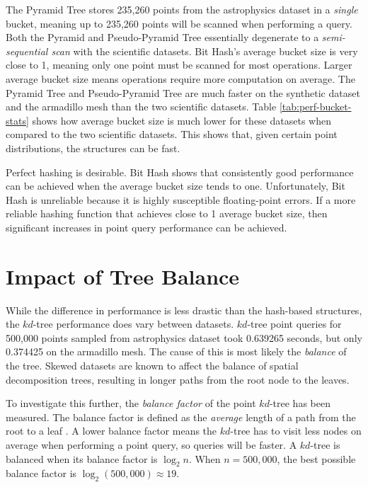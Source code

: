 The Pyramid Tree stores 235,260 points from the astrophysics dataset in a \textit{single} bucket, meaning up to 235,260 points will be scanned when performing a query. Both the Pyramid and Pseudo-Pyramid Tree essentially degenerate to a \textit{semi-sequential scan} with the scientific datasets. Bit Hash's average bucket size is very close to 1, meaning only one point must be scanned for most operations. Larger average bucket size means operations require more computation on average. The Pyramid Tree and Pseudo-Pyramid Tree are much faster on the synthetic dataset and the armadillo mesh than the two scientific datasets. Table \ref{tab:perf-bucket-stats} shows how average bucket size is much lower for these datasets when compared to the two scientific datasets. This shows that, given certain point distributions, the structures can be fast.

Perfect hashing is desirable. Bit Hash shows that consistently good performance can be achieved when the average bucket size tends to one. Unfortunately, Bit Hash is unreliable because it is highly susceptible floating-point errors. If a more reliable hashing function that achieves close to 1 average bucket size, then significant increases in point query performance can be achieved.

\section{Impact of Tree Balance}

While the difference in performance is less drastic than the hash-based structures, the $kd$-tree performance does vary between datasets. $kd$-tree point queries for 500,000 points sampled from astrophysics dataset took 0.639265 seconds, but only 0.374425 on the armadillo mesh. The cause of this is most likely the \textit{balance} of the tree. Skewed datasets are known to affect the balance of spatial decomposition trees, resulting in longer paths from the root node to the leaves.

To investigate this further, the \textit{balance factor} of the point $kd$-tree has been measured. The balance factor is defined as the \textit{average} length of a path from the root to a leaf \cite{kdtree-v-bdtree}. A lower balance factor means the $kd$-tree has to visit less nodes on average when performing a point query, so queries will be faster. A $kd$-tree is balanced when its balance factor is $\log_2 n$. When $n = 500,000$, the best possible balance factor is $\log_2 (500,000) \approx 19$.

